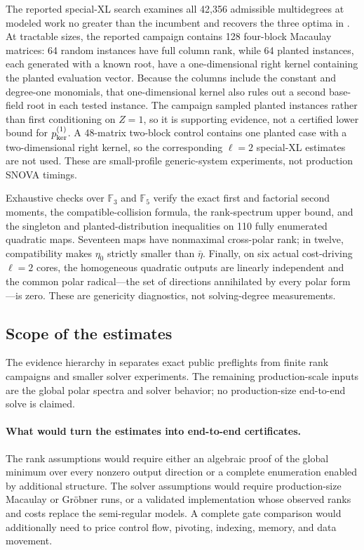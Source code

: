 \documentclass[11pt]{article}
\newcommand{\F}{\mathbb F}
\begin{document}
The reported special-XL search examines all 42,356 admissible multidegrees at modeled
work no greater than the incumbent and recovers the three optima in
.  At tractable sizes, the reported campaign contains 128 four-block
Macaulay matrices: 64 random instances have full column rank, while 64 planted
instances, each generated with a known root, have a one-dimensional right
kernel containing the planted evaluation vector.  Because the columns include
the constant and degree-one monomials, that one-dimensional kernel also rules
out a second base-field root in each tested instance.  The campaign sampled
planted instances rather than first conditioning on $Z=1$, so it is supporting
evidence, not a certified lower bound for $p_{\rm ker}^{(1)}$.  A 48-matrix two-block control
contains one planted case with a two-dimensional right kernel, so the
corresponding $\ell=2$ special-XL estimates are not used.  These are
small-profile generic-system experiments, not production SNOVA timings.

Exhaustive checks over $\F_3$ and $\F_5$ verify the exact first and factorial
second moments, the compatible-collision formula, the rank-spectrum upper bound,
and the singleton and planted-distribution inequalities on 110 fully enumerated
quadratic maps.  Seventeen maps have nonmaximal cross-polar rank; in twelve,
compatibility makes $\eta_0$ strictly smaller than $\bar\eta$.  Finally, on
six actual cost-driving $\ell=2$ cores, the homogeneous quadratic outputs are
linearly independent and the common polar radical---the set of directions
annihilated by every polar form---is zero.  These are genericity diagnostics,
not solving-degree measurements.

\subsection{Scope of the estimates}

The evidence hierarchy in  separates exact public
preflights from finite rank campaigns and smaller solver experiments.  The
remaining production-scale inputs are the global polar spectra and solver
behavior; no production-size end-to-end solve is claimed.

\paragraph{What would turn the estimates into end-to-end certificates.}
The rank assumptions would require either an algebraic proof of the global
minimum over every nonzero output direction or a complete enumeration enabled
by additional structure.  The solver assumptions would require
production-size Macaulay or Gr\"obner runs, or a validated implementation
whose observed ranks and costs replace the semi-regular models.  A complete
gate comparison would additionally need to price control flow, pivoting,
indexing, memory, and data movement.
\end{document}
